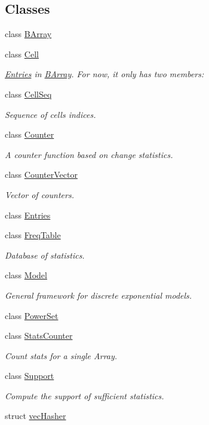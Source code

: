 \subsection*{Classes}
\begin{DoxyCompactItemize}
\item 
class \hyperlink{classbarry_1_1_b_array}{B\+Array}
\item 
class \hyperlink{classbarry_1_1_cell}{Cell}
\begin{DoxyCompactList}\small\item\em \hyperlink{classbarry_1_1_entries}{Entries} in \hyperlink{classbarry_1_1_b_array}{B\+Array}. For now, it only has two members\+: \end{DoxyCompactList}\item 
class \hyperlink{classbarry_1_1_cell_seq}{Cell\+Seq}
\begin{DoxyCompactList}\small\item\em Sequence of cells indices. \end{DoxyCompactList}\item 
class \hyperlink{classbarry_1_1_counter}{Counter}
\begin{DoxyCompactList}\small\item\em A counter function based on change statistics. \end{DoxyCompactList}\item 
class \hyperlink{classbarry_1_1_counter_vector}{Counter\+Vector}
\begin{DoxyCompactList}\small\item\em Vector of counters. \end{DoxyCompactList}\item 
class \hyperlink{classbarry_1_1_entries}{Entries}
\item 
class \hyperlink{classbarry_1_1_freq_table}{Freq\+Table}
\begin{DoxyCompactList}\small\item\em Database of statistics. \end{DoxyCompactList}\item 
class \hyperlink{classbarry_1_1_model}{Model}
\begin{DoxyCompactList}\small\item\em General framework for discrete exponential models. \end{DoxyCompactList}\item 
class \hyperlink{classbarry_1_1_power_set}{Power\+Set}
\item 
class \hyperlink{classbarry_1_1_stats_counter}{Stats\+Counter}
\begin{DoxyCompactList}\small\item\em Count stats for a single Array. \end{DoxyCompactList}\item 
class \hyperlink{classbarry_1_1_support}{Support}
\begin{DoxyCompactList}\small\item\em Compute the support of sufficient statistics. \end{DoxyCompactList}\item 
struct \hyperlink{structbarry_1_1vec_hasher}{vec\+Hasher}
\end{DoxyCompactItemize}
